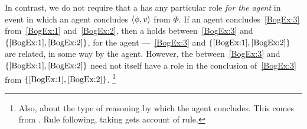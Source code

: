 \begin{note}
  In contrast, we do not require that a \ros{} has any particular role \emph{for the agent} in event in which an agent concludes \(\langle \phi, v \rangle\) from \(\Phi\).
  If an agent concludes~\ref{BogEx:3} from~\ref{BogEx:1} and~\ref{BogEx:2}, then a \ros{} holds between~\ref{BogEx:3} and \(\{\ref{BogEx:1}, \ref{BogEx:2}\}\), for the agent ---~\ref{BogEx:3} and \(\{\ref{BogEx:1}, \ref{BogEx:2}\}\) are related, in some way by the agent.
  However, the \ros{} between~\ref{BogEx:3} and \(\{\ref{BogEx:1}, \ref{BogEx:2}\}\) need not itself have a role in the \agents{} conclusion of~\ref{BogEx:3} from \(\{\ref{BogEx:1}, \ref{BogEx:2}\}\).%
  \footnote{
    Also, about the type of reasoning by which the agent concludes.
    This comes from \textcite{Boghossian:2008vf,Boghossian:2012vb}.
    Rule following, taking gets account of rule.
  }
\end{note}

